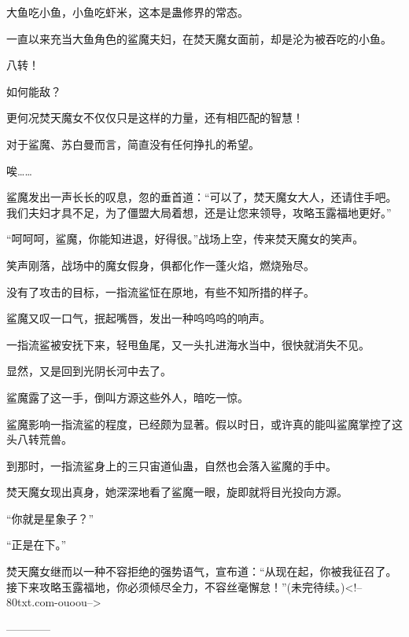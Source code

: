 \begin{this_body}
大鱼吃小鱼，小鱼吃虾米，这本是蛊修界的常态。

一直以来充当大鱼角色的鲨魔夫妇，在焚天魔女面前，却是沦为被吞吃的小鱼。

八转！

如何能敌？

更何况焚天魔女不仅仅只是这样的力量，还有相匹配的智慧！

对于鲨魔、苏白曼而言，简直没有任何挣扎的希望。

唉……

鲨魔发出一声长长的叹息，忽的垂首道：“可以了，焚天魔女大人，还请住手吧。我们夫妇才具不足，为了僵盟大局着想，还是让您来领导，攻略玉露福地更好。”

“呵呵呵，鲨魔，你能知进退，好得很。”战场上空，传来焚天魔女的笑声。

笑声刚落，战场中的魔女假身，俱都化作一蓬火焰，燃烧殆尽。

没有了攻击的目标，一指流鲨怔在原地，有些不知所措的样子。

鲨魔又叹一口气，抿起嘴唇，发出一种呜呜呜的响声。

一指流鲨被安抚下来，轻甩鱼尾，又一头扎进海水当中，很快就消失不见。

显然，又是回到光阴长河中去了。

鲨魔露了这一手，倒叫方源这些外人，暗吃一惊。

鲨魔影响一指流鲨的程度，已经颇为显著。假以时日，或许真的能叫鲨魔掌控了这头八转荒兽。

到那时，一指流鲨身上的三只宙道仙蛊，自然也会落入鲨魔的手中。

焚天魔女现出真身，她深深地看了鲨魔一眼，旋即就将目光投向方源。

“你就是星象子？”

“正是在下。”

焚天魔女继而以一种不容拒绝的强势语气，宣布道：“从现在起，你被我征召了。接下来攻略玉露福地，你必须倾尽全力，不容丝毫懈怠！”(未完待续。)<!--80txt.com-ouoou-->

------------

\end{this_body}

